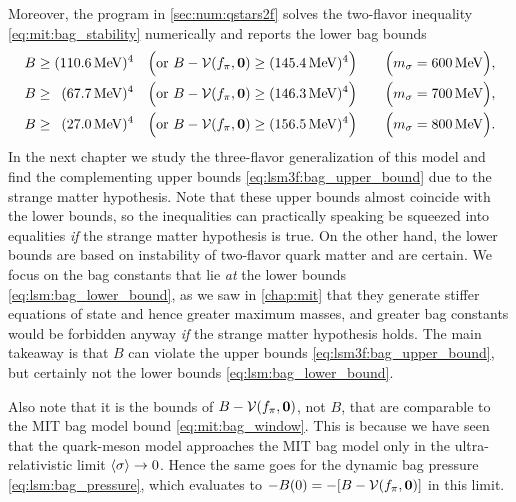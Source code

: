 Moreover, the program in \cref{sec:num:qstars2f} solves the two-flavor inequality \eqref{eq:mit:bag_stability} numerically
and reports the lower bag bounds
\begin{subequations}
\begin{align}
	B \geq (\SI{110.6}{\mega\electronvolt})^4           \quad \Big(\text{or } B-\mathcal{V}(f_\pi,{\bm{0}}) \geq (\SI{145.4}{\mega\electronvolt})^4\Big) \qquad \Big(m_\sigma = \SI{600}{\mega\electronvolt}\Big), \label{eq:lsm:bag_lower_bound_600} \\
	B \geq \phantom{0}(\SI{67.7}{\mega\electronvolt})^4 \quad \Big(\text{or } B-\mathcal{V}(f_\pi,{\bm{0}}) \geq (\SI{146.3}{\mega\electronvolt})^4\Big) \qquad \Big(m_\sigma = \SI{700}{\mega\electronvolt}\Big), \label{eq:lsm:bag_lower_bound_700} \\
	B \geq \phantom{0}(\SI{27.0}{\mega\electronvolt})^4 \quad \Big(\text{or } B-\mathcal{V}(f_\pi,{\bm{0}}) \geq (\SI{156.5}{\mega\electronvolt})^4\Big) \qquad \Big(m_\sigma = \SI{800}{\mega\electronvolt}\Big). \label{eq:lsm:bag_lower_bound_800}
\end{align}%
\label{eq:lsm:bag_lower_bound}%
\end{subequations}%
In the next chapter we study the three-flavor generalization of this model
and find the complementing upper bounds \eqref{eq:lsm3f:bag_upper_bound}
due to the strange matter hypothesis.
Note that these upper bounds almost coincide with the lower bounds,
so the inequalities can practically speaking be squeezed into equalities \emph{if} the strange matter hypothesis is true.
On the other hand, 
the lower bounds are based on instability of two-flavor quark matter and are certain.
We focus on the bag constants that lie \emph{at} the lower bounds \eqref{eq:lsm:bag_lower_bound},
as we saw in \cref{chap:mit} that they generate stiffer equations of state and hence greater maximum masses,
and greater bag constants would be forbidden anyway \emph{if} the strange matter hypothesis holds.
The main takeaway is that $B$ can violate the upper bounds \eqref{eq:lsm3f:bag_upper_bound},
but certainly not the lower bounds \eqref{eq:lsm:bag_lower_bound}.

Also note that it is the bounds of $B-\mathcal{V}(f_\pi,{\bm{0}})$, not $B$,
that are comparable to the MIT bag model bound \eqref{eq:mit:bag_window}.
This is because we have seen that the quark-meson model
approaches the MIT bag model only in the ultra-relativistic limit $\langle \sigma \rangle \rightarrow 0$.
Hence the same goes for the dynamic bag pressure \eqref{eq:lsm:bag_pressure},
which evaluates to $-B(0)=-[B-\mathcal{V}(f_\pi,{\bm{0}})]$ in this limit.

